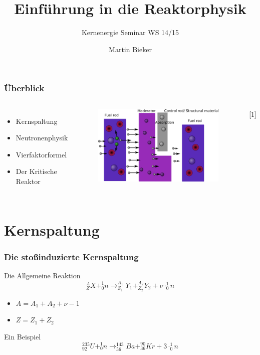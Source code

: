 \documentclass{beamer}[9pt]
\title[Reaktorphysik]{Einführung in die Reaktorphysik}
\author{Martin Bieker}
\subtitle{Kernenergie Seminar WS 14/15}
\date{}
\begin{document}
\begin{frame}
\titlepage 
\end{frame}


\begin{frame}
\frametitle{Überblick}

\begin{columns}[c] 

\begin{itemize}
\item Kernspaltung
\item Neutronenphysik
\item Vierfaktorformel
\item Der Kritische Reaktor
\end{itemize}

\begin{figure}[htp]
\centering
\includegraphics[scale=0.2]{thermal_reactor_full.png}

\end{figure}
\hspace{.5\columnwidth}[1]
\end{columns}


\end{frame}

\section[]{Kernspaltung}

\begin{frame}
\frametitle{Die stoßinduzierte Kernspaltung}

\begin{block}{Die Allgemeine Reaktion}
\[
^{A}_{Z}X + ^1_0n \rightarrow ^{A_1}_{Z_1}Y_1 + ^{A_2}_{Z_2}Y_2 + \nu \cdot ^1_0n
\]

\begin{itemize}
\item$A = A_1 + A_2 + \nu -1 $
\item $Z = Z_1 + Z_2$
\end{itemize}
\end{block}

\begin{block}{Ein Beispiel}
\[
^{235}_{92}U + ^1_0n \rightarrow ^{143}_{56}Ba + ^{90}_{36}Kr + 3 \cdot ^1_0n
\]
\end{block}


\end{frame}
\end{document}
